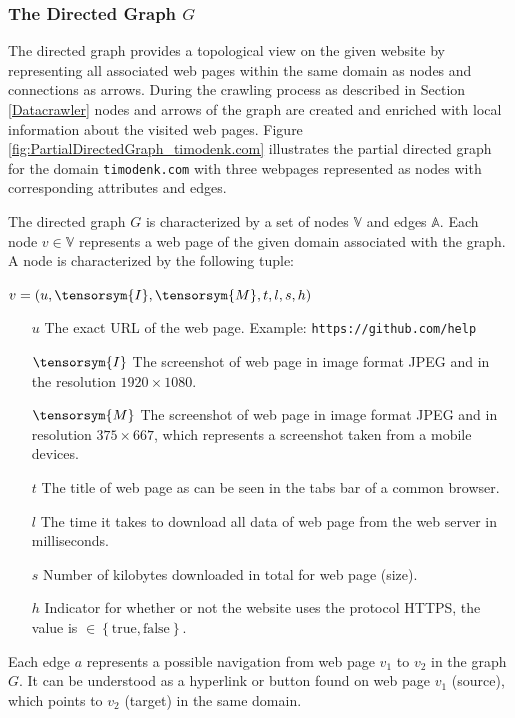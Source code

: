 \subsubsection{The Directed Graph $G$}
\label{TheDirectedGraph}
The directed graph provides a topological view on the given website by representing all associated web pages within the same domain as nodes and connections as arrows. During the crawling process as described in Section \ref{Datacrawler} nodes and arrows of the graph are created and enriched with local information about the visited web pages. Figure \ref{fig:PartialDirectedGraph_timodenk.com} illustrates the partial directed graph for the domain \texttt{timodenk.com} with three webpages represented as nodes with corresponding attributes and edges.

The directed graph $G$ is characterized by a set of nodes $\mathbb{V}$ and edges $\mathbb{A}$. Each node $v \in \mathbb{V}$ represents a web page of the given domain associated with the graph. A node is characterized by the following tuple:

\begin{center}
$v = (u, \tensorsym{I}, \tensorsym{M},t, l, s, h)$
\begin{itemize}
	\item[$u$] The exact URL of the web page. Example: \texttt{https://github.com/help}
	\item[$\tensorsym{I}$] The screenshot of web page in image format JPEG and in the resolution $1920\times1080$. 
	\item[$\tensorsym{M}$] The screenshot of web page in image format JPEG and in resolution $375\times 667$, which represents a screenshot taken from a mobile devices.
	\item[$t$] The title of web page as can be seen in the tabs bar of a common browser.
	\item[$l$] The time it takes to download all data of web page from the web server in milliseconds.
	\item[$s$] Number of kilobytes downloaded in total for web page (size).
	\item[$h$] Indicator for whether or not the website uses the protocol HTTPS, the value is $\in\left\{\text{true}, \text{false}\right\}$.
\end{itemize}
\end{center}

Each edge $a$ represents a possible navigation from web page $v_1$ to $v_2$ in the graph $G$. It can be understood as a hyperlink or button found on web page $v_1$ (source), which points to $v_2$ (target) in the same domain. 

